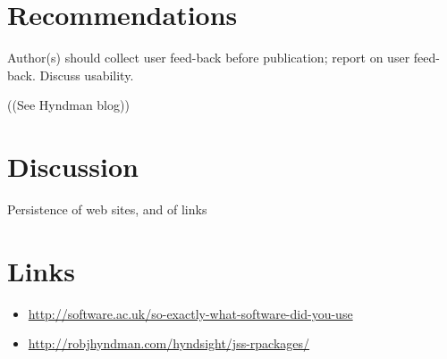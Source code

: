 \documentclass{article}
\begin{document}
\section{Recommendations}
Author(s) should collect user feed-back before publication; report
on user feed-back. Discuss usability.

((See Hyndman blog))

\section{Discussion}
Persistence of web sites, and of links

\section{Links}


\begin{itemize}
\item \url{http://software.ac.uk/so-exactly-what-software-did-you-use}
\item \url{http://robjhyndman.com/hyndsight/jss-rpackages/}
\end{itemize}
\end{document}
